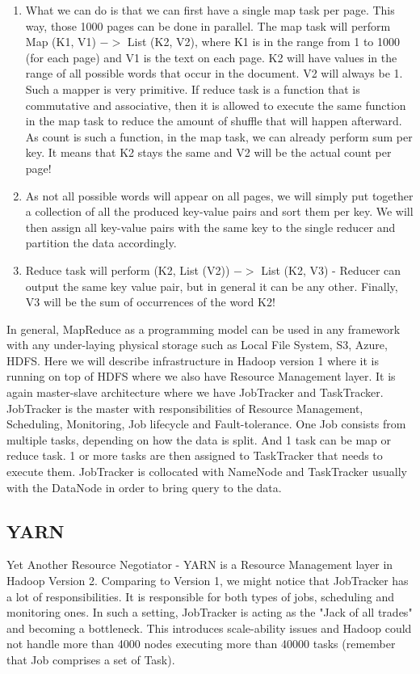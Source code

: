 \begin{enumerate}
	\item What we can do is that we can first have a single map task per page. This way, those 1000 pages can be done in parallel. The map task will perform Map (K1, V1) $->$ List (K2, V2), where K1 is in the range from 1 to 1000 (for each page) and V1 is the text on each page. K2 will have values in the range of all possible words that occur in the document. V2 will always be 1. Such a mapper is very primitive. If reduce task is a function that is commutative and associative, then it is allowed to execute the same function in the map task to reduce the amount of shuffle that will happen afterward. As count is such a function, in the map task, we can already perform sum per key. It means that K2 stays the same and V2 will be the actual count per page!
	\item As not all possible words will appear on all pages, we will simply put together a collection of all the produced key-value pairs and sort them per key. We will then assign all key-value pairs with the same key to the single reducer and partition the data accordingly.
	\item Reduce task will perform (K2, List (V2)) $->$ List (K2, V3) - Reducer can output the same key value pair, but in general it can be any other. Finally, V3 will be the sum of occurrences of the word K2!
\end{enumerate}
   
In general, MapReduce as a programming model can be used in any framework with any under-laying physical storage such as Local File System, S3, Azure, HDFS. Here we will describe infrastructure in Hadoop version 1 where it is running on top of HDFS where we also have Resource Management layer. It is again master-slave architecture where we have JobTracker and TaskTracker. JobTracker is the master with responsibilities of Resource Management, Scheduling, Monitoring, Job lifecycle and Fault-tolerance. One Job consists from multiple tasks, depending on how the data is split. And 1 task can be map or reduce task. 1 or more tasks are then assigned to TaskTracker that needs to execute them. JobTracker is collocated with NameNode and TaskTracker usually with the DataNode in order to bring query to the data. 

\subsection{YARN}
Yet Another Resource Negotiator -  YARN \cite{YARN} is a Resource Management layer in Hadoop Version 2. Comparing to Version 1, we might notice that JobTracker has a lot of responsibilities. It is responsible for both types of jobs, scheduling and monitoring ones. In such a setting, JobTracker is acting as the "Jack of all trades" and becoming a bottleneck. This introduces scale-ability issues and Hadoop could not handle more than 4000 nodes executing more than 40000 tasks (remember that Job comprises a set of Task). 

